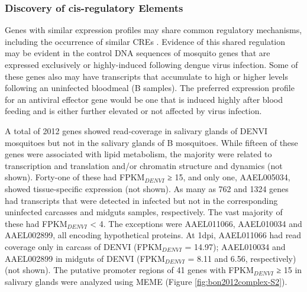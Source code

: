 \subsubsection{Discovery of cis-regulatory Elements}

Genes with similar expression profiles may share common regulatory mechanisms, including the occurrence of similar \glspl{CRE} \cite{Sieglaff2009}.
Evidence of this shared regulation may be evident in the control DNA sequences of mosquito genes that are expressed exclusively or highly-induced following dengue virus infection.
Some of these genes also may have transcripts that accumulate to high or higher levels following an uninfected bloodmeal (B samples).
The preferred expression profile for an antiviral effector gene would be one that is induced highly after blood feeding and is either further elevated or not affected by virus infection.

A total of 2012 genes showed read-coverage in salivary glands of \gls{DENVI} mosquitoes but not in the salivary glands of B mosquitoes.
While fifteen of these genes were associated with lipid metabolism, the majority were related to transcription and translation and/or chromatin structure and dynamics (not shown).
Forty-one of these had FPKM$_{DENVI}$ ≥ 15, and only one, AAEL005034, showed tissue-specific expression (not shown).
As many as 762 and 1324 genes had transcripts that were detected in infected but not in the corresponding uninfected carcasses and midguts samples, respectively.
The vast majority of these had FPKM$_{DENVI}$ < 4.
The exceptions were AAEL011066, AAEL010034 and AAEL002899, all encoding hypothetical proteins.
At 1\gls{dpi}, AAEL011066 had read coverage only in carcass of \gls{DENVI} (FPKM$_{DENVI}$ = 14.97); AAEL010034 and AAEL002899 in midguts of \gls{DENVI} (FPKM$_{DENVI}$ = 8.11 and 6.56, respectively) (not shown).
The putative promoter regions of 41 genes with FPKM$_{DENVI}$ ≥ 15 in salivary glands were analyzed using MEME \cite{Bailey2006} (Figure \ref{fig:bon2012complex-S2}).

